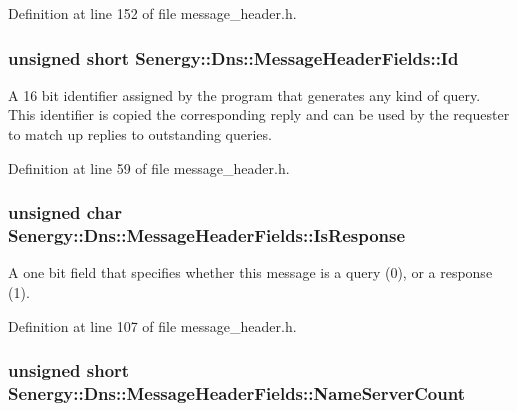Definition at line 152 of file message\-\_\-header.\-h.

\hypertarget{struct_senergy_1_1_dns_1_1_message_header_fields_ab423a1e91fecd6ad2ec36a4bdafd5c2b}{
\subsubsection[{Id}]{\setlength{\rightskip}{0pt plus 5cm}unsigned short Senergy\-::\-Dns\-::\-Message\-Header\-Fields\-::\-Id}}\label{struct_senergy_1_1_dns_1_1_message_header_fields_ab423a1e91fecd6ad2ec36a4bdafd5c2b}


A 16 bit identifier assigned by the program that generates any kind of query. This identifier is copied the corresponding reply and can be used by the requester to match up replies to outstanding queries. 



Definition at line 59 of file message\-\_\-header.\-h.

\hypertarget{struct_senergy_1_1_dns_1_1_message_header_fields_a0d0ac4fa85684c3d66a84e3392f3ef99}{
\subsubsection[{Is\-Response}]{\setlength{\rightskip}{0pt plus 5cm}unsigned char Senergy\-::\-Dns\-::\-Message\-Header\-Fields\-::\-Is\-Response}}\label{struct_senergy_1_1_dns_1_1_message_header_fields_a0d0ac4fa85684c3d66a84e3392f3ef99}


A one bit field that specifies whether this message is a query (0), or a response (1). 



Definition at line 107 of file message\-\_\-header.\-h.

\hypertarget{struct_senergy_1_1_dns_1_1_message_header_fields_a963b92841b3f7fc5fc9268c963d32d8d}{
\subsubsection[{Name\-Server\-Count}]{\setlength{\rightskip}{0pt plus 5cm}unsigned short Senergy\-::\-Dns\-::\-Message\-Header\-Fields\-::\-Name\-Server\-Count}}\label{struct_senergy_1_1_dns_1_1_message_header_fields_a963b92841b3f7fc5fc9268c963d32d8d}


